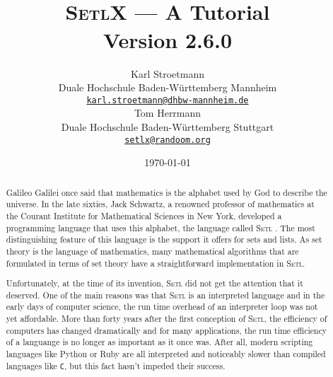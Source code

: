\documentclass[twoside]{report}
\title{\vspace*{-1cm}
  \epsfig{file=aleph0.eps,scale=0.21} \\[0.5cm]
\textsc{SetlX} --- A Tutorial \\[0.5cm]
Version 2.6.0
}
\author{Karl Stroetmann \\[0.2cm]
Duale Hochschule Baden-W\"urttemberg Mannheim \\[0.2cm]
\href{mailto:karl.stroetmann@dhbw-mannheim.de}{\texttt{karl.stroetmann@dhbw-mannheim.de}} \\[0.5cm]
 Tom Herrmann  \\[0.2cm]
Duale Hochschule Baden-W\"urttemberg Stuttgart \\[0.2cm]
\href{mailto:setlx@randoom.org}{\texttt{setlx@randoom.org}}
}
\date{\today}
\begin{document}
\maketitle

\begin{abstract}
Galileo Galilei once said that mathematics is the alphabet used by God to describe the universe.
In the late sixties, Jack Schwartz, a renowned professor of mathematics at the Courant Institute for
Mathematical Sciences in New York, developed a programming language that uses this alphabet, the
language called \textsc{Setl} \cite{schwartz:1970, setl86}.  The most distinguishing feature of this language is the
support it offers for sets and lists.   As set theory is the language of mathematics, many mathematical
algorithms that are formulated in terms of set theory have a straightforward implementation in
\textsc{Setl}. 

Unfortunately, at the time of its invention, \textsc{Setl} did not get the attention that it deserved.
One of the main reasons was that \textsc{Setl} is an interpreted language and in the early days of
computer science, the run time overhead of an interpreter loop was not yet affordable.  More than
forty years after the first conception of \textsc{Setl}, the efficiency of computers has changed
dramatically and for many applications, the run time efficiency of a languange is no
longer as important as it once was.  After all, 
modern scripting languages like Python \cite{vanRossum:95} or Ruby \cite{flanagan:2008}
are all interpreted and noticeably slower than compiled languages like \texttt{C}, but this
fact hasn't impeded their success. 


\end{abstract}
\end{document}
